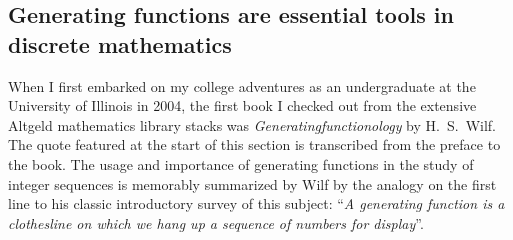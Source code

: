 \documentclass[12pt,reqno,a4letter]{article}
\numberwithin{figure}{section}
\numberwithin{table}{section}
\numberwithin{equation}{section}
\theoremstyle{plain}
\numberwithin{theorem}{section}
\theoremstyle{definition}
\begin{document}
\subsection{Generating functions are essential tools in discrete mathematics}

When I first embarked on my college adventures as an 
undergraduate at the University of Illinois in 2004, the 
first book I checked out from the extensive 
Altgeld mathematics library stacks was \emph{Generatingfunctionology} by 
H.~S.~Wilf. The quote featured at the start of this section is transcribed from the 
preface to the book. The usage and importance of 
generating functions in the study of integer sequences is memorably 
summarized by Wilf by the analogy on the first line to his classic introductory 
survey of this subject: 
``\emph{A generating function is a clothesline on which we hang up a sequence of numbers for display}''. 
\end{document}
